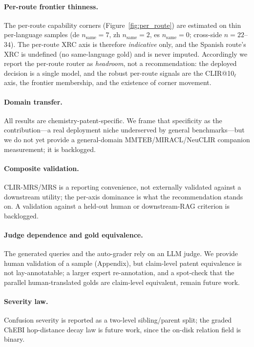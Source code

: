 \documentclass[11pt]{article}
\begin{document}
\paragraph{Per-route frontier thinness.}
The per-route capability corners (Figure~\ref{fig:per_route}) are estimated on
thin per-language samples (de $n_{\text{same}}{=}7$, zh $n_{\text{same}}{=}2$, es
$n_{\text{same}}{=}0$; cross-side $n{=}22$--$34$). The per-route XRC axis is
therefore \emph{indicative} only, and the Spanish route's XRC is undefined (no
same-language gold) and is never imputed. Accordingly we report the per-route
router as \emph{headroom}, not a recommendation: the deployed decision is a single
model, and the robust per-route signals are the CLIR@10$_\ell$ axis, the frontier
membership, and the existence of corner movement.

\paragraph{Domain transfer.}
All results are chemistry-patent-specific. We frame that specificity as the
contribution---a real deployment niche underserved by general benchmarks---but
we do not yet provide a general-domain MMTEB/MIRACL/NeuCLIR companion
measurement; it is backlogged.

\paragraph{Composite validation.}
CLIR-MRS/MRS is a reporting convenience, not externally validated against a
downstream utility; the per-axis dominance is what the recommendation stands on.
A validation against a held-out human or downstream-RAG criterion is backlogged.

\paragraph{Judge dependence and gold equivalence.}
The generated queries and the auto-grader rely on an LLM judge. We provide human
validation of a sample (Appendix), but claim-level patent equivalence is not
lay-annotatable; a larger expert re-annotation, and a spot-check that the
parallel human-translated golds are claim-level equivalent, remain future work.

\paragraph{Severity law.}
Confusion severity is reported as a two-level sibling/parent split; the graded
ChEBI hop-distance decay law is future work, since the on-disk relation field is
binary.
\end{document}
